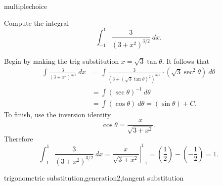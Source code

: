\documentclass{ximera}
\begin{document}
\begin{question}[TrigSub017]
\begin{type}
multiplechoice
\end{type}
Compute the integral 
\[\int_{-1}^{1}\frac{3}{(3+x^2)^{3/2}}~dx.\]
\begin{multiplechoice}
\end{multiplechoice}
\begin{feedback}
Begin by making the trig substitution \(x=\sqrt{3}\tan \theta\). It follows that 
\[ \begin{aligned} \int\frac{3}{(3+x^2)^{3/2}}~dx & = \int \frac{3}{(3+(\sqrt{3}\tan \theta)^2)^{3/2}} \cdot (\sqrt{3}\sec^2 \theta)~d \theta \\
 & = \int (\sec \theta)^{-1}~d \theta \\ & = \int (\cos \theta) ~ d \theta = (\sin \theta) + C. \end{aligned} \]
To finish, use the inversion identity \[\cos \theta = \frac{x}{\sqrt{3+x^2}}.\]
Therefore \[\int_{-1}^{1}\frac{3}{(3+x^2)^{3/2}}~dx = \left.\frac{x}{\sqrt{3+x^2}}\right|_{-1}^{1} = \left(\frac{1}{2}\right) - \left(-\frac{1}{2}\right) = 1.\]
\end{feedback}
\begin{keywords}
trigonometric substitution,generation2,tangent substitution
\end{keywords}
\end{question}
\end{document}
